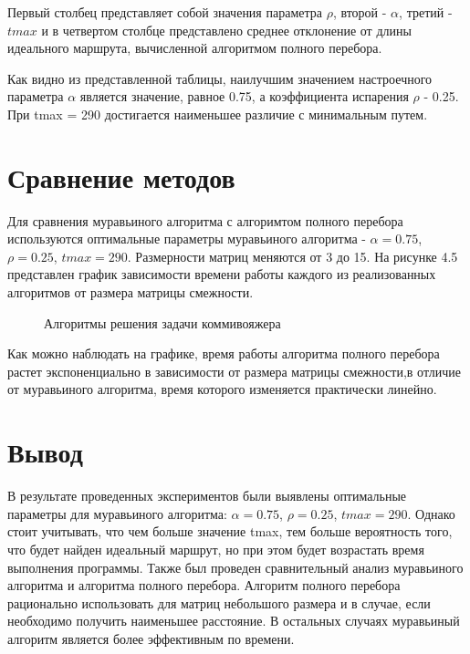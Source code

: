 \documentclass[a4paper,12pt]{report}
\begin{document}
Первый столбец представляет собой значения параметра $\rho$, второй - $\alpha$, третий - $tmax$ и в четвертом столбце представлено среднее отклонение от длины идеального маршрута, вычисленной алгоритмом полного перебора.

Как видно из представленной таблицы, наилучшим значением настроечного параметра $\alpha$ является значение, равное 0.75, а коэффициента испарения $\rho$ -  0.25. При tmax = 290 достигается наименьшее различие с минимальным путем.

\section{Сравнение методов}
\hspace{0.6cm}Для сравнения муравьиного алгоритма с алгоримтом полного перебора используются оптимальные параметры муравьиного алгоритма - $\alpha = 0.75$, $\rho = 0.25$, $ tmax = 290$. Размерности матриц меняются от 3 до 15. На рисунке 4.5 представлен график зависимости времени работы каждого из реализованных алгоритмов от размера матрицы смежности.

\begin{figure}[ht!]
\begin{center}
\caption{Алгоритмы решения задачи коммивояжера}
\end{center}
\end{figure}

Как можно наблюдать на графике, время работы алгоритма полного перебора растет экспоненциально в зависимости от размера матрицы смежности,в отличие от муравьиного алгоритма, время которого изменяется практически линейно.

\section{Вывод}
\hspace{0.6cm}В результате проведенных экспериментов были выявлены оптимальные параметры для муравьиного алгоритма: $\alpha = 0.75$, $\rho = 0.25$, $ tmax = 290$. Однако стоит учитывать, что чем больше значение tmax, тем больше вероятность того, что будет найден идеальный маршрут, но при этом будет возрастать время выполнения программы. Также был проведен сравнительный анализ муравьиного алгоритма и алгоритма полного перебора. Алгоритм полного перебора рационально использовать для матриц небольшого размера и в случае, если необходимо получить наименьшее расстояние. В остальных случаях муравьиный алгоритм является более эффективным по времени.
\end{document}

